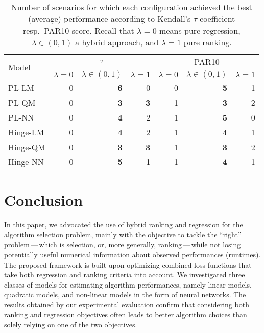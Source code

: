 \documentclass[runningheads]{llncs}
\begin{document}
\begin{table}[ht]
    \caption{Number of scenarios for which each configuration achieved the best (average) performance according to Kendall's $\tau$ coefficient resp.\ PAR10 score. Recall that $\lambda=0$ means pure regression, $\lambda \in (0,1)$ a hybrid approach, and $\lambda = 1$ pure ranking. %
    }
    \centering
\begin{adjustbox}{width={7cm}}
\begin{tabular}{|l|rrr|rrr|}
\hline
\multirow{2}{*}{Model} & \multicolumn{3}{c|}{$\tau$}                         & \multicolumn{3}{c|}{PAR10}                          \\ \cline{2-7} 
                      & $\lambda = 0$ & $\lambda \in (0,1)$ & $\lambda = 1$ & $\lambda = 0$ & $\lambda \in (0,1)$ & $\lambda = 1$ \\ \hline
PL-LM                  & 0             & \textbf{6}          & 0             & 0             & \textbf{5}          & 1             \\
PL-QM                  & 0             & \textbf{3}          & \textbf{3}    & 1             & \textbf{3}          & 2             \\
PL-NN                  & 0             & \textbf{4}          & 2             & 1             & \textbf{5}          & 0             \\ \hline
Hinge-LM               & 0             & \textbf{4}          & 2            & 1             & \textbf{4}           & 1              \\
Hinge-QM               & 0             & \textbf{3}          & \textbf{3}    & 1            & \textbf{3}            & 2          \\
Hinge-NN               & 0             & \textbf{5}          & 1             & 1             & \textbf{4}          & 1             \\ \hline
\end{tabular}
\end{adjustbox}
    \label{tab:summary_results}
\end{table}

\section{Conclusion}
In this paper, we advocated the use of hybrid ranking and regression for the algorithm selection problem, mainly with the objective to tackle the ``right'' problem\,---\,which is selection, or, more generally, ranking\,---\,while not losing potentially useful numerical information about observed performances (runtimes). 
The proposed framework is built upon optimizing combined loss functions that take both regression and ranking criteria into account. We investigated three classes of models for estimating algorithm performances, namely linear models, quadratic models, and non-linear models in the form of neural networks. The results obtained by our experimental evaluation confirm that considering both ranking and regression objectives often leads to better algorithm choices than solely relying on one of the two objectives.
\end{document}
